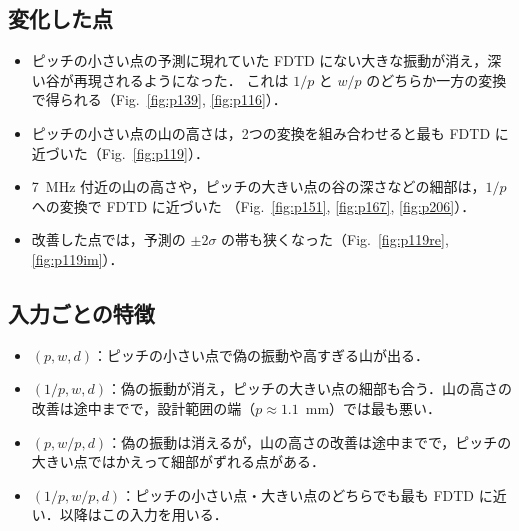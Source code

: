 \documentclass{jarticle}
\begin{document}
\subsection*{変化した点}
\begin{itemize}
 \item ピッチの小さい点の予測に現れていた FDTD にない大きな振動が消え，深い谷が再現されるようになった．
       これは $1/p$ と $w/p$ のどちらか一方の変換で得られる（Fig.~\ref{fig:p139}, \ref{fig:p116}）．
 \item ピッチの小さい点の山の高さは，2つの変換を組み合わせると最も FDTD に近づいた（Fig.~\ref{fig:p119}）．
 \item 7~MHz 付近の山の高さや，ピッチの大きい点の谷の深さなどの細部は，$1/p$ への変換で FDTD に近づいた
       （Fig.~\ref{fig:p151}, \ref{fig:p167}, \ref{fig:p206}）．
 \item 改善した点では，予測の $\pm 2\sigma$ の帯も狭くなった（Fig.~\ref{fig:p119re}, \ref{fig:p119im}）．
\end{itemize}

\subsection*{入力ごとの特徴}
\begin{itemize}
 \item $(p, w, d)$：ピッチの小さい点で偽の振動や高すぎる山が出る．
 \item $(1/p, w, d)$：偽の振動が消え，ピッチの大きい点の細部も合う．山の高さの改善は途中までで，設計範囲の端（$p \approx 1.1$~mm）では最も悪い．
 \item $(p, w/p, d)$：偽の振動は消えるが，山の高さの改善は途中までで，ピッチの大きい点ではかえって細部がずれる点がある．
 \item $(1/p, w/p, d)$：ピッチの小さい点・大きい点のどちらでも最も FDTD に近い．以降はこの入力を用いる．
\end{itemize}
\end{document}
